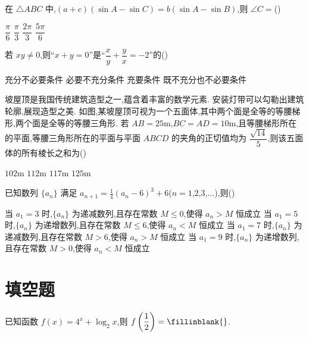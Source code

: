 \begin{problem}
在 \(\triangle ABC\) 中,\((a+c)(\sin A-\sin C)=b(\sin A-\sin B)\),则 \(\angle C=\)(\quad)

\choices
    {\(\dfrac{\pi}{6}\)}
    {\(\dfrac{\pi}{3}\)}
    {\(\dfrac{2\pi}{3}\)}
    {\(\dfrac{5\pi}{6}\)}
\end{problem}

\begin{problem}
若 \(xy\ne 0\),则``\(x+y=0\)''是``\(\dfrac{x}{y}+\dfrac{y}{x}=-2\)''的(\quad)

\choices
    {充分不必要条件}
    {必要不充分条件}
    {充要条件}
    {既不充分也不必要条件}
\end{problem}

\begin{problem}
坡屋顶是我国传统建筑造型之一,蕴含着丰富的数学元素. 安装灯带可以勾勒出建筑轮廓,展现造型之美. 如图,某坡屋顶可视为一个五面体,其中两个面是全等的等腰梯形,两个面是全等的等腰三角形. 若 \(AB=25\text{m}\),\(BC=AD=10\text{m}\),且等腰梯形所在的平面,等腰三角形所在的平面与平面 \(ABCD\) 的夹角的正切值均为 \(\dfrac{\sqrt{14}}{5}\),则该五面体的所有棱长之和为(\quad)


\choices
    {\(102\text{m}\)}
    {\(112\text{m}\)}
    {\(117\text{m}\)}
    {\(125\text{m}\)}
\end{problem}

\begin{problem}
已知数列 \(\{a_n\}\) 满足 \(a_{n+1}=\frac{1}{4}(a_n-6)^3+6\)(\(n=1\),\(2\),\(3\),\(\dots\)),则(\quad)

\choices
    {当 \(a_1=3\) 时,\(\{a_n\}\) 为递减数列,且存在常数 \(M\le 0\),使得 \(a_n>M\) 恒成立}
    {当 \(a_1=5\) 时,\(\{a_n\}\) 为递增数列,且存在常数 \(M\le 6\),使得 \(a_n<M\) 恒成立}
    {当 \(a_1=7\) 时,\(\{a_n\}\) 为递减数列,且存在常数 \(M>6\),使得 \(a_n>M\) 恒成立}
    {当 \(a_1=9\) 时,\(\{a_n\}\) 为递增数列,且存在常数 \(M>0\),使得 \(a_n<M\) 恒成立}
\end{problem}

\section{填空题}

\begin{problem}
已知函数 \(f(x)=4^x+\log_2 x\),则 \(f\left(\dfrac{1}{2}\right)=\fillinblank{}\).
\end{problem}

